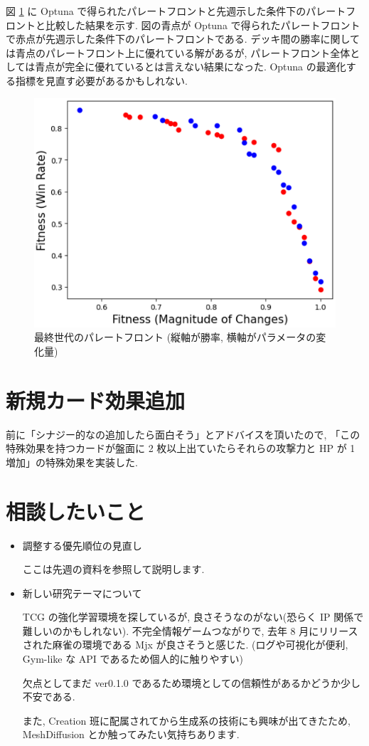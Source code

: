 \documentclass{jarticle}     %
\begin{document}
図 \ref{fig:fwfp} に Optuna で得られたパレートフロントと先週示した条件下のパレートフロントと比較した結果を示す. 
図の青点が Optuna で得られたパレートフロントで赤点が先週示した条件下のパレートフロントである. 
デッキ間の勝率に関しては青点のパレートフロント上に優れている解があるが, パレートフロント全体としては青点が完全に優れているとは言えない結果になった. 
Optuna の最適化する指標を見直す必要があるかもしれない. 

\begin{figure}[ht]
  \centering
  \includegraphics[width=120mm]{assets/compair.eps}
  \vspace{-0.3cm}
  \caption{最終世代のパレートフロント (縦軸が勝率, 横軸がパラメータの変化量)}
  \label{fig:fwfp}
\end{figure}


\section{新規カード効果追加}
前に「シナジー的なの追加したら面白そう」とアドバイスを頂いたので, 
「この特殊効果を持つカードが盤面に 2 枚以上出ていたらそれらの攻撃力と HP が 1 増加」の特殊効果を実装した.

\section{相談したいこと}
\begin{itemize}
  \item 調整する優先順位の見直し
  \par
  ここは先週の資料を参照して説明します.
  \item 新しい研究テーマについて
  \par
  TCG の強化学習環境を探しているが, 良さそうなのがない(恐らく IP 関係で難しいのかもしれない). 不完全情報ゲームつながりで, 去年 8 月にリリースされた麻雀の環境である Mjx \cite{Mjx} が良さそうと感じた. (ログや可視化が便利, Gym-like な API であるため個人的に触りやすい) \par
  欠点としてまだ ver0.1.0 であるため環境としての信頼性があるかどうか少し不安である. \par
  また, Creation 班に配属されてから生成系の技術にも興味が出てきたため, MeshDiffusion \cite{MeshDiffusion} とか触ってみたい気持ちあります. 
\end{itemize}




\end{document}
